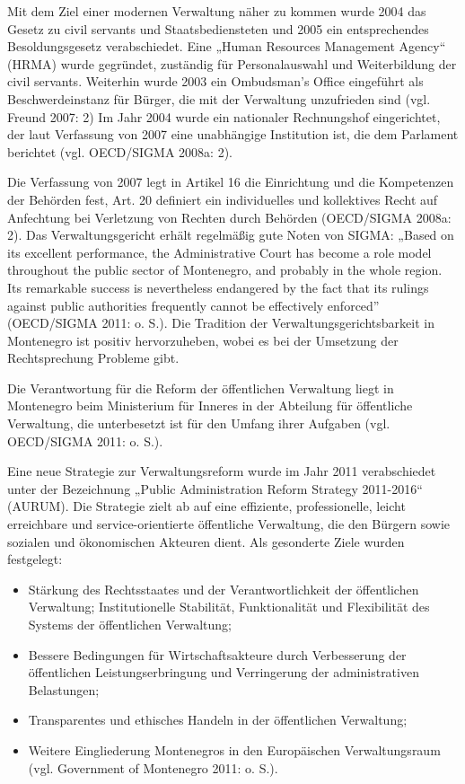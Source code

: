Mit dem Ziel einer modernen Verwaltung näher zu kommen wurde 2004 das Gesetz zu civil servants und Staatsbediensteten und 2005 ein entsprechendes Besoldungsgesetz verabschiedet. Eine „Human Resources Management Agency“ (HRMA) wurde gegründet, zuständig für Personalauswahl und Weiterbildung der civil servants. Weiterhin wurde 2003 ein Ombudsman’s Office eingeführt als Beschwerdeinstanz für Bürger, die mit der Verwaltung unzufrieden sind (vgl. Freund 2007: 2) Im Jahr 2004 wurde ein nationaler Rechnungshof eingerichtet, der laut Verfassung von 2007 eine unabhängige Institution ist, die dem Parlament berichtet (vgl. OECD/SIGMA 2008a: 2).\par
Die Verfassung von 2007 legt in Artikel 16 die Einrichtung und die Kompetenzen der Behörden fest, Art. 20 definiert ein individuelles und kollektives Recht auf Anfechtung bei Verletzung von Rechten durch Behörden (OECD/SIGMA 2008a: 2). Das Verwaltungsgericht erhält regelmäßig gute Noten von SIGMA: „Based on its excellent performance, the Administrative Court has become a role model throughout the public sector of Montenegro, and probably in the whole region. Its remarkable success is nevertheless endangered by the fact that its rulings against public authorities frequently cannot be effectively enforced” (OECD/SIGMA 2011: o. S.). Die Tradition der Verwaltungsgerichtsbarkeit in Montenegro ist positiv hervorzuheben, wobei es bei der Umsetzung der Rechtsprechung Probleme gibt. \par
Die Verantwortung für die Reform der öffentlichen Verwaltung liegt in Montenegro beim Ministerium für Inneres in der Abteilung für öffentliche Verwaltung, die unterbesetzt ist für den Umfang ihrer Aufgaben (vgl. OECD/SIGMA 2011: o. S.).\par
Eine neue Strategie zur Verwaltungsreform wurde im Jahr 2011 verabschiedet unter der Bezeichnung „Public Administration Reform Strategy 2011-2016“ (AURUM). Die Strategie zielt ab auf eine effiziente, professionelle, leicht erreichbare und service-orientierte öffentliche Verwaltung, die den Bürgern sowie sozialen und ökonomischen Akteuren dient. Als gesonderte Ziele wurden festgelegt:
\begin{itemize}
\item Stärkung des Rechtsstaates und der Verantwortlichkeit der öffentlichen Verwaltung;
Institutionelle Stabilität, Funktionalität und Flexibilität des Systems der öffentlichen Verwaltung; 
\item Bessere Bedingungen für Wirtschaftsakteure durch Verbesserung der öffentlichen Leistungserbringung und Verringerung der administrativen Belastungen; 
\item Transparentes und ethisches Handeln in der öffentlichen Verwaltung; 
\item Weitere Eingliederung Montenegros in den Europäischen Verwaltungsraum (vgl. Government of Montenegro 2011: o. S.).
\end{itemize}

